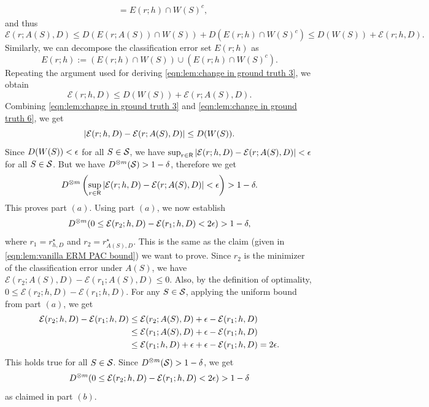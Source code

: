 \begin{apdxproof}
\begin{equation}
\begin{aligned}
        &= E(r;h) \cap W(S)^c,
    \end{aligned}
\end{equation}
and thus
\begin{equation}\label{eqn:lem:change in ground truth 3}
    \mathcal{E}(r; A(S),D) \leq D(E(r; A(S)) \cap W(S)) + D(E(r; h) \cap W(S)^c) \leq D(W(S)) + \mathcal{E}(r; h,D).
\end{equation}
Similarly, we can decompose the classification error set $E(r;h)$ as
\[E(r;h) := (E(r;h) \cap W(S)) \cup (E(r;h)\cap W(S)^c).\]
Repeating the argument used for deriving \eqref{eqn:lem:change in ground truth 3}, we obtain
\begin{equation}\label{eqn:lem:change in ground truth 6}
    \mathcal{E}(r; h,D) \leq D(W(S)) + \mathcal{E}(r; A(S),D).
\end{equation}
Combining \eqref{eqn:lem:change in ground truth 3} and \eqref{eqn:lem:change in ground truth 6}, we get
\[| \mathcal{E}(r;h,D) - \mathcal{E}(r;A(S),D) | \leq D(W(S)).\] 
Since $D(W(S)) < \epsilon$ for all $S \in \mathcal{S}$, we have $\sup_{r \in \mathsf{R}} | \mathcal{E}(r;h,D) - \mathcal{E}(r;A(S),D) | < \epsilon$ for all $S \in \mathcal{S}$. But we have $D^{\otimes m}(\mathcal{S}) > 1-\delta$, therefore we get 
\begin{equation}\label{eqn:lem:change in ground truth 5}
    D^{\otimes m}\left(\sup_{r \in \mathsf{R}} |\mathcal{E}(r; h,D) - \mathcal{E}(r; A(S), D)|  < \epsilon\right) > 1-\delta.
\end{equation}
This proves part $(a)$.
Using part $(a)$, we now establish
\begin{equation}
    D^{\otimes m}(0 \leq \mathcal{E}(r_2;h,D) - \mathcal{E}(r_1;h,D) < 2\epsilon) > 1-\delta,
\end{equation}
where $r_1 = r^\star_{h,D}$ and $r_2 = r^\star_{A(S),D}$. This is the same as the claim (given in \eqref{eqn:lem:vanilla ERM PAC bound}) we want to prove.
Since $r_2$ is the minimizer of the classification error under $A(S)$, we have $\mathcal{E}(r_2; A(S),D) - \mathcal{E}(r_1; A(S),D) \leq 0$. Also, by the definition of optimality, $0 \leq \mathcal{E}(r_2; h,D) - \mathcal{E}(r_1; h,D)$.
For any $S \in \mathcal{S}$, applying the uniform bound from part $(a)$, we get
\begin{equation}
\begin{aligned}
    \mathcal{E}(r_2; h,D) - \mathcal{E}(r_1; h,D) &\leq \mathcal{E}(r_2; A(S),D) + \epsilon - \mathcal{E}(r_1; h,D) \\
    &\leq \mathcal{E}(r_1; A(S),D) + \epsilon - \mathcal{E}(r_1; h,D) \\
    &\leq \mathcal{E}(r_1; h,D) + \epsilon + \epsilon - \mathcal{E}(r_1; h,D) = 2\epsilon.
\end{aligned}
\end{equation}
This holds true for all $S \in \mathcal{S}$. Since $D^{\otimes m}(\mathcal{S}) > 1-\delta$, we get 
\[D^{\otimes m}(0 \leq \mathcal{E}(r_2; h,D) - \mathcal{E}(r_1; h,D) < 2\epsilon) > 1-\delta
\]
as claimed in part $(b)$.
\end{apdxproof}

